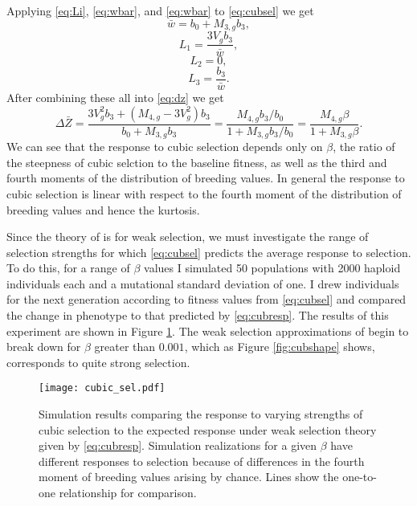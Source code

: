 Applying \eqref{eq:Li}, \eqref{eq:wbar}, and \eqref{eq:wbar} to
\eqref{eq:cubsel} we get
\begin{equation}
  \bar{w} = b_0 + M_{3,g}b_3,
\end{equation}
\begin{equation}
  L_1 = \frac{3V_gb_3}{\bar{w}},
\end{equation}
\begin{equation}
  L_2 = 0,
\end{equation}
\begin{equation}
  L_3 = \frac{b_3}{\bar{w}}.
\end{equation}
After combining these all into \eqref{eq:dz} we get
\begin{equation}
  \label{eq:cubresp}
  \Delta \bar{Z} = \frac{3 V_g^2b_3 + (M_{4,g}-3V_g^2)b_3}{b_0 + M_{3,g}b_3} =
  \frac{M_{4,g}b_3/b_0}{1 + M_{3,g}b_3/b_0} = \frac{M_{4,g}\beta}{1 +
    M_{3,g}\beta}.
\end{equation}
We can see that the response to cubic selection depends only on $\beta$, the
ratio of the steepness of cubic selction to the baseline fitness, as well as the
third and fourth moments of the distribution of breeding values. In general the
response to cubic selection is linear with respect to the fourth moment of the
distribution of breeding values and hence the kurtosis.

Since the theory of \citet{Turelli1990} is for weak selection, we must
investigate the range of selection strengths for which \eqref{eq:cubsel}
predicts the average response to selection. To do this, for a range of $\beta$
values I simulated 50 populations with 2000 haploid individuals each and a
mutational standard deviation of one. I drew individuals for the next generation
according to fitness values from \eqref{eq:cubsel} and compared the change in
phenotype to that predicted by \eqref{eq:cubresp}. The results of this
experiment are shown in Figure \ref{fig:incrcub}. The weak selection
approximations of \citet{Turelli1990} begin to break down for $\beta$ greater
than $0.001$, which as Figure \ref{fig:cubshape} shows, corresponds to quite
strong selection. 

\begin{figure}
  \centering
  \label{fig:incrcub}
  \texttt{[image: cubic\_sel.pdf]}
    \caption{Simulation results comparing the response to varying strengths of
    cubic selection to the expected response under weak selection theory given
    by \eqref{eq:cubresp}. Simulation realizations for a given $\beta$ have
    different responses to selection because of differences in the fourth moment
    of breeding values arising by chance. Lines show the one-to-one relationship
    for comparison.}
\end{figure}
